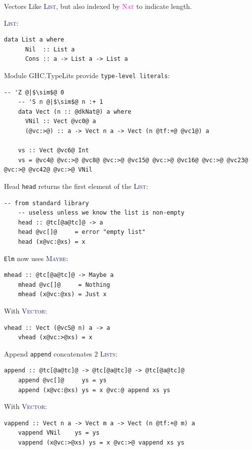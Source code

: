 \documentclass[xcolor={usenames,dvipsnames}]{beamer}
\newcommand{\htycon}[1]{\textcolor{MidnightBlue}{\textsc{#1}}}
\newcommand{\hkind}[1]{\textcolor{Fuchsia}{\textsc{#1}}}
\begin{document}
\begin{frame}[fragile]{Vectors}
  Like \htycon{List}, but also indexed by \hkind{Nat} to indicate length.

  \htycon{List}:
  \begin{lstlisting}[style=hask]
    data List a where
      Nil  :: List a
      Cons :: a -> List a -> List a
  \end{lstlisting}

  Module GHC.TypeLits provide \texttt{type-level literals}:
  \begin{lstlisting}[style=hask]
    -- 'Z @|$\sim$@ 0
    -- 'S n @|$\sim$@ n :+ 1
    data Vect (n :: @dkNat@) a where
      VNil :: Vect @vc0@ a
      (@vc:>@) :: a -> Vect n a -> Vect (n @tf:+@ @vc1@) a

    vs :: Vect @vc6@ Int
    vs = @vc4@ @vc:>@ @vc8@ @vc:>@ @vc15@ @vc:>@ @vc16@ @vc:>@ @vc23@ @vc:>@ @vc42@ @vc:>@ VNil
  \end{lstlisting}
\end{frame}

\begin{frame}[fragile]{Head}
  \texttt{head} returns the first element of the \htycon{List}:
  \begin{lstlisting}[style=hask]
    -- from standard library
    -- useless unless we know the list is non-empty
    head :: @tc[@a@tc]@ -> a
    head @vc[]@     = error "empty list"
    head (x@vc:@xs) = x
  \end{lstlisting}

  \pause
  \texttt{Elm} now uses \htycon{Maybe}:
  \begin{lstlisting}[style=hask]
    mhead :: @tc[@a@tc]@ -> Maybe a
    mhead @vc[]@     = Nothing
    mhead (x@vc:@xs) = Just x
  \end{lstlisting}

  \pause
  With \htycon{Vector}:
  \begin{lstlisting}[style=hask]
    vhead :: Vect (@vcS@ n) a -> a
    vhead (x@vc:>@xs) = x
  \end{lstlisting}
\end{frame}

\begin{frame}[fragile]{Append}
  \texttt{append} concatenates 2 \htycon{Lists}:
  \begin{lstlisting}[style=hask]
    append :: @tc[@a@tc]@ -> @tc[@a@tc]@ -> @tc[@a@tc]@
    append @vc[]@     ys = ys
    append (x@vc:@xs) ys = x @vc:@ append xs ys
  \end{lstlisting}

  With \htycon{Vector}:
  \begin{lstlisting}[style=hask]
    vappend :: Vect n a -> Vect m a -> Vect (n @tf:+@ m) a
    vappend VNil    ys = ys
    vappend (x@vc:>@xs) ys = x @vc:>@ vappend xs ys
  \end{lstlisting}
\end{frame}
\end{document}
